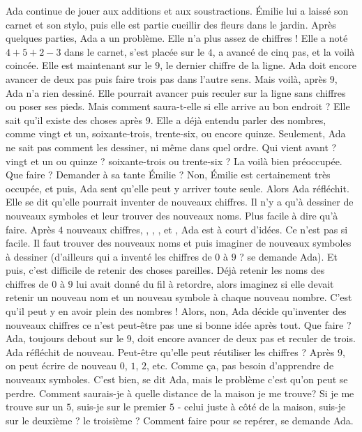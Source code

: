 Ada continue de jouer aux additions et aux soustractions. 
Émilie lui a laissé son carnet et son stylo, puis elle est partie cueillir des fleurs dans le jardin. 
Après quelques parties, Ada a un problème. 
Elle n’a plus assez de chiffres ! 
Elle a noté $4 + 5 + 2 - 3$ dans le carnet, s’est placée sur le $4$, a avancé de cinq pas, et la voilà coincée. 
Elle est maintenant sur le $9$, le dernier chiffre de la ligne. 
Ada doit encore avancer de deux pas puis faire trois pas dans l’autre sens.
Mais voilà, après $9$, Ada n’a rien dessiné.
Elle pourrait avancer puis reculer sur la ligne sans chiffres ou poser ses pieds. Mais comment saura-t-elle si elle arrive au bon endroit ? 
Elle sait qu’il existe des choses après $9$. 
Elle a déjà entendu parler des nombres, comme vingt et un, soixante-trois, trente-six, ou encore quinze. 
Seulement, Ada ne sait pas comment les dessiner, ni même dans quel ordre.
Qui vient avant ? vingt et un ou quinze ? soixante-trois ou trente-six ?
La voilà bien préoccupée. Que faire ? Demander à sa tante Émilie ? Non, Émilie est certainement très occupée, et puis, Ada sent qu’elle peut y arriver toute seule. Alors Ada réfléchit. Elle se dit qu’elle pourrait inventer de nouveaux chiffres. 
Il n’y a qu'à dessiner de nouveaux symboles et leur trouver des nouveaux noms. Plus facile à dire qu'à faire. Après $4$ nouveaux chiffres, , , , et , Ada est à court d'idées. 
Ce n’est pas si facile. Il faut trouver des nouveaux noms et puis imaginer de nouveaux symboles à dessiner (d’ailleurs qui a inventé les chiffres de $0$ à $9$ ? se demande Ada). Et puis, c’est difficile de retenir des choses pareilles. Déjà retenir les noms des chiffres de $0$ à $9$ lui avait donné du fil à retordre, alors imaginez si elle devait retenir un nouveau nom et un nouveau symbole à chaque nouveau nombre.
C’est qu’il peut y en avoir plein des nombres ! 
Alors, non, Ada décide qu’inventer des nouveaux chiffres ce n’est peut-être pas une si bonne idée après tout. 
Que faire ? Ada, toujours debout sur le $9$, doit encore avancer de deux pas et reculer de trois. Ada réfléchit de nouveau. Peut-être qu’elle peut réutiliser les chiffres ? 
Après $9$, on peut écrire de nouveau $0$, $1$, $2$, etc. Comme ça, pas besoin d’apprendre de nouveaux symboles. C’est bien, se dit Ada, mais le problème c’est qu’on peut se perdre. 
Comment saurais-je à quelle distance de la maison je me trouve? Si je me trouve sur un $5$, suis-je sur le premier $5$ - celui juste à côté de la maison, suis-je sur le deuxième ? le troisième ? Comment faire pour se repérer, se demande Ada.
